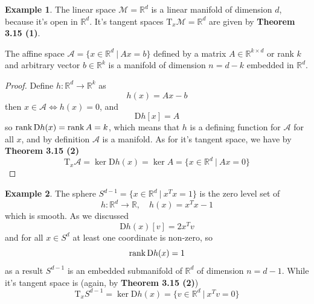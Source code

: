 \documentclass[12pt]{article}
\newcommand*{\T}{\mathrm{T}}
\newcommand*{\D}{\mathrm{D}}
\theoremstyle{definition}
\newtheorem{example}{Example}[section]
\begin{document}
\setcounter{example}{16}

\begin{example}
    The linear space $\mathcal{M} = \mathbb{R}^{d}$ is a linear manifold of dimension $d$, because it's open in $\mathbb{R}^{d}$. It's tangent spaces $\T_x \mathcal{M} = \mathbb{R}^{d}$ are given by \textbf{Theorem 3.15 (1)}. 

    The affine space $\mathcal{A} = \{x \in \mathbb{R}^{d} \ | \ Ax = b\}$ defined by a matrix $A \in \mathbb{R}^{k \times d}$ or rank $k$ and arbitrary vector $b \in \mathbb{R}^{k}$ is a manifold of dimension $n = d - k$ embedded in $\mathbb{R}^{d}$. 
    \begin{proof}
        Define $h : \mathbb{R}^{d} \to \mathbb{R}^{k}$ as 
        \begin{equation}
            h(x) = Ax - b 
        \end{equation}  
        then $x \in \mathcal{A} \Leftrightarrow h(x) = 0$, and 
        \begin{equation}
            \D h[x] = A 
        \end{equation}
        so $\rank \D h(x) = \rank A = k$, which means that $h$ is a defining function for $\mathcal{A}$ for all $x$, and by definition $\mathcal{A}$ is a manifold. As for it's tangent space, we have by \textbf{Theorem 3.15 (2)}
        \begin{equation}
            \T_x \mathcal{A} = \ker \D h(x) = \ker A = \{x \in \mathbb{R}^{d} \ | \ Ax = 0 \}
        \end{equation}
    \end{proof}
\end{example}

\begin{example}
    The sphere $S^{d-1} = \{x \in \mathbb{R}^{d} \ | \ x^T x = 1\}$ is the zero level set of
    \begin{equation}
        h: \mathbb{R}^{d} \to \mathbb{R}, \quad h(x) = x^T x - 1 
    \end{equation}
    which is smooth. As we discussed 
    \begin{equation}
        \D h(x)[v] = 2x^T v 
    \end{equation}
    and for all $x \in S^{d}$ at least one coordinate is non-zero, so 
    \begin{equation}
        \rank \D h(x) = 1
    \end{equation}
    as a result $S^{d-1}$ is an embedded submanifold of $\mathbb{R}^{d}$ of dimension $n = d -1$. While it's tangent space is (again, by \textbf{Theorem 3.15 (2)})
    \begin{equation}
        \T_x S^{d-1} = \ker \D h(x) = \{v \in \mathbb{R}^{d} \ | \ x^T v = 0\}
    \end{equation}
\end{example}
\end{document}
